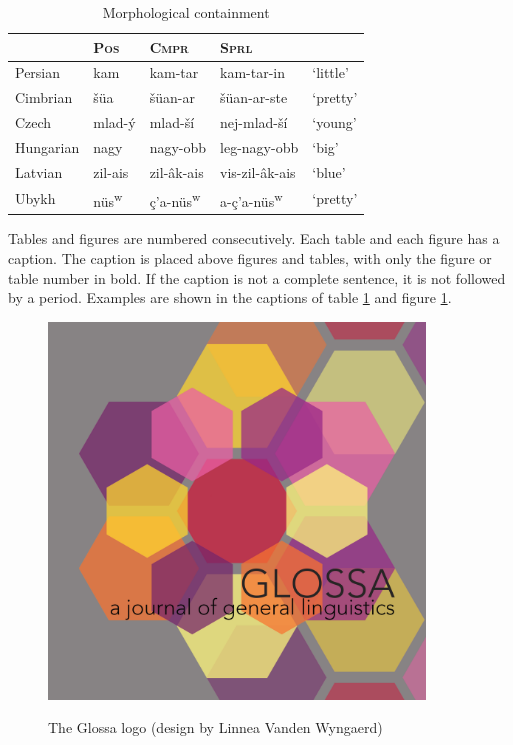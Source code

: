 \documentclass[charis,linguex]{glossa}
\begin{document}
\begin{table}[h]
\sffamily
\centering
\caption{Morphological containment}	
\begin{tabular}{lllll}
 & \textsc{Pos} & \textsc{Cmpr} & \textsc{Sprl}\\
\hline 
Persian & kam & kam-tar & kam-tar-in & ‘little’\\
Cimbrian & šüa & šüan-ar & šüan-ar-ste & ‘pretty’ \\
Czech & mlad-ý & mlad-ší & nej-mlad-ší & ‘young’\\
Hungarian & nagy & nagy-obb & leg-nagy-obb & ‘big’\\
Latvian & zil-ais & zil-âk-ais & vis-zil-âk-ais & ‘blue’\\
Ubykh &  nüs\textsuperscript{w}\textipa{@} & ç’a-nüs\textsuperscript{w}\textipa{@} & a-ç’a-nüs\textsuperscript{w}\textipa{@} & ‘pretty’ \\
\end{tabular}\label{tbl:table1}
\end{table}

Tables and figures are numbered consecutively. Each table and each figure has a caption. The caption is placed above figures and tables, with only the figure or table number in bold.  If the caption is not a complete sentence, it is not followed by a period. Examples are shown in the captions of table \ref{tbl:table1} and figure \ref{fig:glossalogo}. 

\begin{figure}[h]
\centering
\caption{The Glossa logo (design by Linnea Vanden Wyngaerd)}
\includegraphics[width=10cm]{glossa}
\label{fig:glossalogo}
\end{figure}
\end{document}
